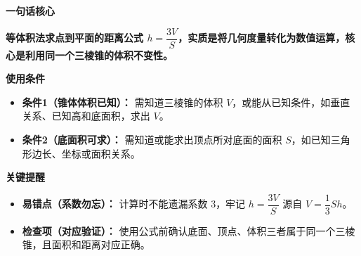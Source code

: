 \begin{summarybox}

	\textbf{\textcolor{CSummary}{一句话核心}}

	\textbf{等体积法求点到平面的距离公式 $h = \dfrac{3V}{S}$，实质是将几何度量转化为数值运算，核心是利用同一个三棱锥的体积不变性。}

	\medskip

	\textbf{\textcolor{CSummary}{使用条件}}

	\begin{itemize}[leftmargin=*, itemsep=0.5em, topsep=0.4em]
		\item \textbf{条件1（锥体体积已知）：} 需知道三棱锥的体积 $V$，或能从已知条件，如垂直关系、已知高和底面积，求出 $V$。

		\item \textbf{条件2（底面积可求）：} 需知道或能求出顶点所对底面的面积 $S$，如已知三角形边长、坐标或面积关系。
	\end{itemize}

	\medskip

	\textbf{\textcolor{CSummary}{关键提醒}}

	\begin{itemize}[leftmargin=*, itemsep=0.5em, topsep=0.4em]
		\item \textbf{易错点（系数勿忘）：} 计算时不能遗漏系数 $3$，牢记 $h = \dfrac{3V}{S}$ 源自 $V = \dfrac13 S h$。

		\item \textbf{检查项（对应验证）：} 使用公式前确认底面、顶点、体积三者属于同一个三棱锥，且面积和距离对应正确。
	\end{itemize}

\end{summarybox}